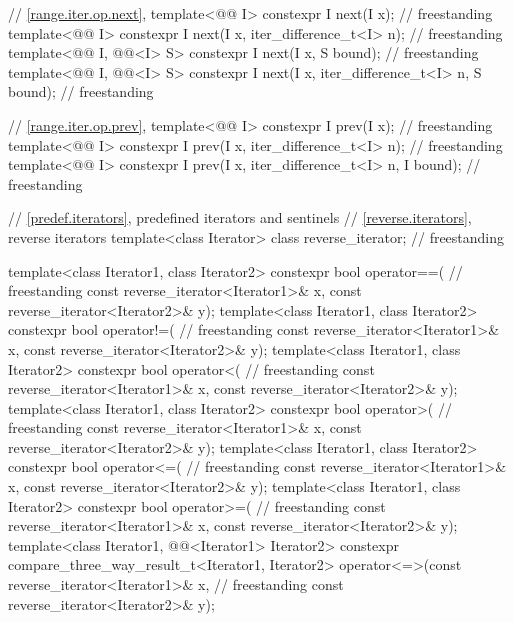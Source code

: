 \begin{codeblock}
{{    // \ref{range.iter.op.next}, 
    template<@@ I>
      constexpr I next(I x);                                                        // freestanding
    template<@@ I>
      constexpr I next(I x, iter_difference_t<I> n);                                // freestanding
    template<@@ I, @@<I> S>
      constexpr I next(I x, S bound);                                               // freestanding
    template<@@ I, @@<I> S>
      constexpr I next(I x, iter_difference_t<I> n, S bound);                       // freestanding

    // \ref{range.iter.op.prev}, 
    template<@@ I>
      constexpr I prev(I x);                                                        // freestanding
    template<@@ I>
      constexpr I prev(I x, iter_difference_t<I> n);                                // freestanding
    template<@@ I>
      constexpr I prev(I x, iter_difference_t<I> n, I bound);                       // freestanding
  }

  // \ref{predef.iterators}, predefined iterators and sentinels
  // \ref{reverse.iterators}, reverse iterators
  template<class Iterator> class reverse_iterator;                                  // freestanding

  template<class Iterator1, class Iterator2>
    constexpr bool operator==(                                                      // freestanding
      const reverse_iterator<Iterator1>& x,
      const reverse_iterator<Iterator2>& y);
  template<class Iterator1, class Iterator2>
    constexpr bool operator!=(                                                      // freestanding
      const reverse_iterator<Iterator1>& x,
      const reverse_iterator<Iterator2>& y);
  template<class Iterator1, class Iterator2>
    constexpr bool operator<(                                                       // freestanding
      const reverse_iterator<Iterator1>& x,
      const reverse_iterator<Iterator2>& y);
  template<class Iterator1, class Iterator2>
    constexpr bool operator>(                                                       // freestanding
      const reverse_iterator<Iterator1>& x,
      const reverse_iterator<Iterator2>& y);
  template<class Iterator1, class Iterator2>
    constexpr bool operator<=(                                                      // freestanding
      const reverse_iterator<Iterator1>& x,
      const reverse_iterator<Iterator2>& y);
  template<class Iterator1, class Iterator2>
    constexpr bool operator>=(                                                      // freestanding
      const reverse_iterator<Iterator1>& x,
      const reverse_iterator<Iterator2>& y);
  template<class Iterator1, @@<Iterator1> Iterator2>
    constexpr compare_three_way_result_t<Iterator1, Iterator2>
      operator<=>(const reverse_iterator<Iterator1>& x,                             // freestanding
                  const reverse_iterator<Iterator2>& y);

}
\end{codeblock}
